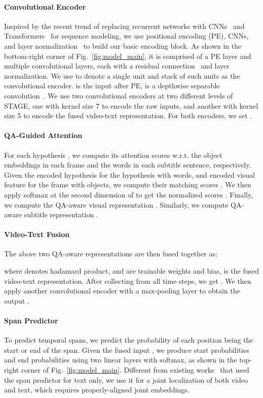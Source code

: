 \documentclass[11pt,a4paper]{article}
\begin{document}
\paragraph{Convolutional Encoder}\label{sec:conv_enc}
Inspired by the recent trend of replacing recurrent networks with CNNs~\cite{Dauphin2016LanguageMW,Yu2018QANetCL} and Transformers~\cite{Vaswani2017AttentionIA,Devlin2018BERTPO} for sequence modeling, we use positional encoding (PE), CNNs, and layer normalization~\cite{Ba2016LayerN} to build our basic encoding block. 
As shown in the bottom-right corner of Fig.~\ref{fig:model_main}, it is comprised of a PE layer and multiple convolutional layers, each with a residual connection~\cite{He2016DeepRL} and layer normalization. 
We use  to denote a single  unit and stack  of such units as the convolutional encoder.  is the input after PE,  is a depthwise separable convolution~\cite{Chollet2017XceptionDL}.
We use two convolutional encoders at two different levels of STAGE, one with kernel size 7 to encode the raw inputs, and another with kernel size 5 to encode the fused video-text representation. 
For both encoders, we set .


\paragraph{QA-Guided Attention} 
For each hypothesis , we compute its attention scores w.r.t. the object embeddings in each frame and the words in each subtitle sentence, respectively. 
Given the encoded hypothesis  for the hypothesis  with  words, and encoded visual feature  for the frame  with  objects, we compute their matching scores . 
We then apply softmax at the second dimension of  to get the normalized scores . 
Finally, we compute the QA-aware visual representation . 
Similarly, we compute QA-aware subtitle representation . 

\paragraph{Video-Text Fusion} 
The above two QA-aware representations are then fused together as:

where  denotes hadamard product,  and  are trainable weights and bias,  is the fused video-text representation. 
After collecting  from all time steps, we get . 
We then apply another convolutional encoder with a max-pooling layer to obtain the output .

\paragraph{Span Predictor} 
To predict temporal spans, we predict the probability of each position being the start or end of the span. 
Given the fused input , we produce start probabilities  and end probabilities   using two linear layers with softmax, as shown in the top-right corner of Fig.~\ref{fig:model_main}. Different from existing works~\cite{Seo2017BidirectionalAF,Yu2018QANetCL} that used the span predictor for text only, we use it for a joint localization of both video and text, which requires properly-aligned joint embeddings.
\end{document}
